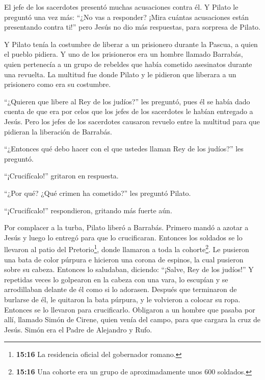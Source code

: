  El jefe de los sacerdotes presentó muchas acusaciones
contra él.  Y Pilato le preguntó una vez más: ``¿No vas a
responder? ¡Mira cuántas acusaciones están presentando contra ti!''
 pero Jesús no dio más respuestas, para sorpresa de Pilato.

 Y Pilato tenía la costumbre de liberar a un prisionero
durante la Pascua, a quien el pueblo pidiera.  Y uno de los
prisioneros era un hombre llamado Barrabás, quien pertenecía a un grupo
de rebeldes que había cometido asesinatos durante una revuelta.
 La multitud fue donde Pilato y le pidieron que liberara a
un prisionero como era su costumbre.

 ``¿Quieren que libere al Rey de los judíos?'' les preguntó,
 pues él se había dado cuenta de que era por celos que los
jefes de los sacerdotes le habían entregado a Jesús.  Pero
los jefes de los sacerdotes causaron revuelo entre la multitud para que
pidieran la liberación de Barrabás.

 ``¿Entonces qué debo hacer con el que ustedes llaman Rey
de los judíos?'' les preguntó.

 ``¡Crucifícalo!'' gritaron en respuesta.

 ``¿Por qué? ¿Qué crimen ha cometido?'' les preguntó
Pilato.

``¡Crucifícalo!'' respondieron, gritando más fuerte aún.

 Por complacer a la turba, Pilato liberó a Barrabás.
Primero mandó a azotar a Jesús y luego lo entregó para que lo
crucificaran.  Entonces los soldados se lo llevaron al
patio del Pretorio\footnote{\textbf{15:16} La residencia oficial del
  gobernador romano.}, donde llamaron a toda la cohorte\footnote{\textbf{15:16}
  Una cohorte era un grupo de aproximadamente unos 600 soldados.}.
 Le pusieron una bata de color púrpura e hicieron una
corona de espinos, la cual pusieron sobre su cabeza. 
Entonces lo saludaban, diciendo: ``¡Salve, Rey de los judíos!''
 Y repetidas veces lo golpearon en la cabeza con una vara,
lo escupían y se arrodillaban delante de él como si lo adorasen.
 Después que terminaron de burlarse de él, le quitaron la
bata púrpura, y le volvieron a colocar su ropa. Entonces se lo llevaron
para crucificarlo.  Obligaron a un hombre que pasaba por
allí, llamado Simón de Cirene, quien venía del campo, para que cargara
la cruz de Jesús. Simón era el Padre de Alejandro y Rufo.

